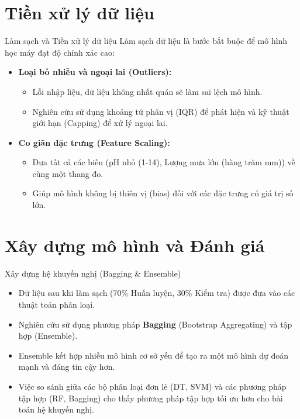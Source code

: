 \documentclass[aspectratio=169]{beamer}
\begin{document}
\section{Tiền xử lý dữ liệu}
\begin{frame}{Làm sạch và Tiền xử lý dữ liệu}
    Làm sạch dữ liệu là bước bắt buộc để mô hình học máy đạt độ chính xác cao:
    \begin{itemize}
        \item \textbf{Loại bỏ nhiễu và ngoại lai (Outliers):} 
        \begin{itemize}
            \item Lỗi nhập liệu, dữ liệu không nhất quán sẽ làm sai lệch mô hình.
            \item Nghiên cứu sử dụng khoảng tứ phân vị (IQR) để phát hiện và kỹ thuật giới hạn (Capping) để xử lý ngoại lai.
        \end{itemize}
        \item \textbf{Co giãn đặc trưng (Feature Scaling):}
        \begin{itemize}
            \item Đưa tất cả các biến (pH nhỏ (1-14), Lượng mưa lớn (hàng trăm mm)) về cùng một thang đo.
            \item Giúp mô hình không bị thiên vị (bias) đối với các đặc trưng có giá trị số lớn.
        \end{itemize}
    \end{itemize}
\end{frame}

\section{Xây dựng mô hình và Đánh giá}
\begin{frame}{Xây dựng hệ khuyến nghị (Bagging \& Ensemble)}
    \begin{itemize}
        \item Dữ liệu sau khi làm sạch (70\% Huấn luyện, 30\% Kiểm tra) được đưa vào các thuật toán phân loại.
        \item Nghiên cứu sử dụng phương pháp \textbf{Bagging} (Bootstrap Aggregating) và tập hợp (Ensemble).
        \item Ensemble kết hợp nhiều mô hình cơ sở yếu để tạo ra một mô hình dự đoán mạnh và đáng tin cậy hơn.
        \item Việc so sánh giữa các bộ phân loại đơn lẻ (DT, SVM) và các phương pháp tập hợp (RF, Bagging) cho thấy phương pháp tập hợp tối ưu hơn cho bài toán hệ khuyến nghị.
    \end{itemize}
\end{frame}
\end{document}
